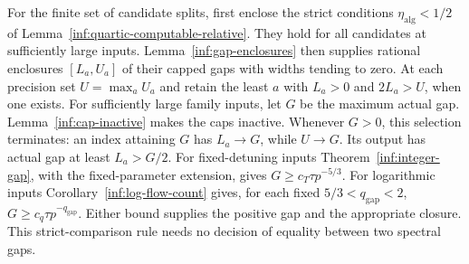 \begin{remark}
\label{inf:split-selection}
For the finite set of candidate splits, first enclose the strict
conditions $\eta_{\mathrm{alg}}<1/2$ of
Lemma~\ref{inf:quartic-computable-relative}. They hold for all
candidates at sufficiently large inputs. Lemma~\ref{inf:gap-enclosures}
then supplies rational enclosures $[L_a,U_a]$ of their capped gaps
with widths tending to zero. At each precision set $U=\max_aU_a$
and retain the least $a$
with $L_a>0$ and $2L_a>U$, when one exists.
For sufficiently large family inputs, let $G$ be the maximum actual
gap. Lemma~\ref{inf:cap-inactive}
makes the caps inactive. Whenever $G>0$, this selection terminates:
an index attaining $G$ has $L_a\to G$, while $U\to G$.
Its output has actual gap at least $L_a>G/2$.
For fixed-detuning inputs Theorem~\ref{inf:integer-gap}, with the
fixed-parameter extension, gives $G\ge c_T\tau p^{-5/3}$.
For logarithmic inputs Corollary~\ref{inf:log-flow-count} gives,
for each fixed $5/3<q_{\mathrm{gap}}<2$,
$G\ge c_q\tau p^{-q_{\mathrm{gap}}}$. Either bound supplies the
positive gap and the appropriate closure. This strict-comparison
rule needs no decision of equality between two spectral gaps.
\end{remark}
